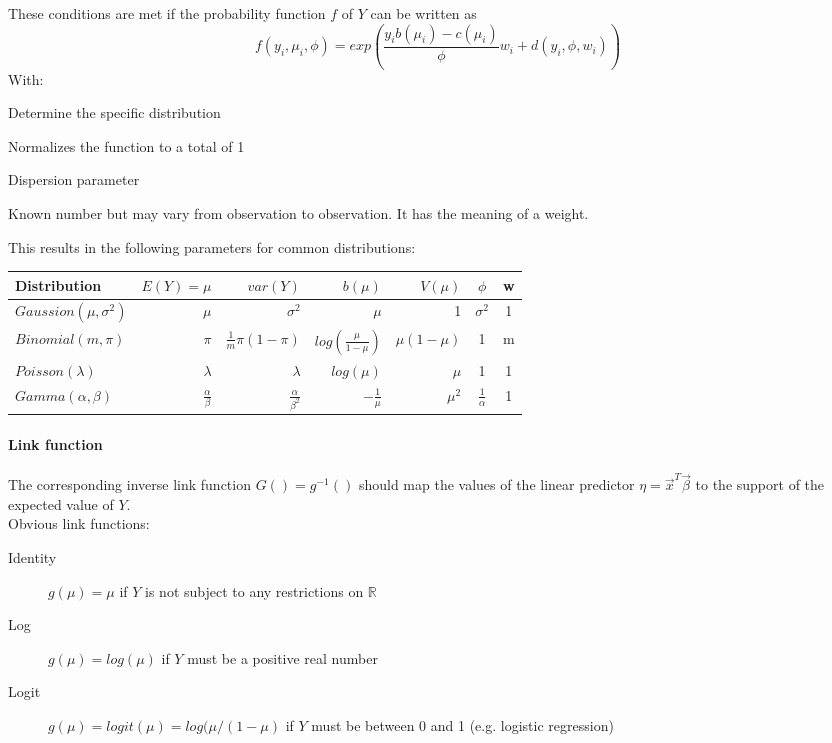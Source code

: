 These conditions are met if the probability function $f$ of $Y$ can be written as
\begin{equation*}
f(y_i, \mu_i, \phi) = exp(\frac{y_i b(\mu_i)-c(\mu_i)}{\phi}w_i+d(y_i, \phi, w_i))
\end{equation*}
With:
\begin{description}
	\tightlist
	\item[$b()$ and $c()$] Determine the specific distribution
	\item[$d()$] Normalizes the function to a total of 1
	\item[$\phi$] Dispersion parameter
	\item[$w_i$] Known number but may vary from observation to observation.	It has the meaning of a weight.
\end{description}

This results in the following parameters for common distributions:

\begin{tabular}{l||rr|rrcc}
	\hline 
	Distribution & $E(Y) = \mu$ & $var(Y)$ & $b(\mu)$ & $V(\mu)$ & $\phi$ & w \\
	\hline
	$Gaussion(\mu, \sigma^2)$ & $\mu$ & $\sigma^2$ & $\mu$ & 1 & $\sigma^2$ & 1\\
	$Binomial(m, \pi)$ & $\pi$ & $\frac{1}{m}\pi(1-\pi)$ & $log(\frac{\mu}{1-\mu})$ & $\mu(1-\mu)$ & 1 & m\\
	$Poisson(\lambda)$ & $\lambda$ & $\lambda$ & $log(\mu)$ & $\mu$ & 1 & 1\\
	$Gamma(\alpha, \beta)$ & $\frac{\alpha}{\beta}$ & $\frac{\alpha}{\beta^2}$ & $-\frac{1}{\mu}$ & $\mu^2$ & $\frac{1}{\alpha}$ & 1\\
	\hline
\end{tabular}

\paragraph{Link function}
The corresponding inverse link function $G() = g^{-1}()$ should map the values of the linear predictor $\eta = \vec{x}^T \vec{\beta}$ to the support of the expected value of $Y$.\\
Obvious link functions:
\begin{description}
	\item[Identity] $g(\mu) = \mu$ if $Y$ is not subject to any restrictions on $\mathbb{R}$
	\item[Log] $g(\mu) = log(\mu)$ if $Y$ must be a positive real number
	\item[Logit] $g(\mu) = logit(\mu)=log(\mu/(1-\mu)$ if $Y$ must be between 0 and 1 (e.g. logistic regression)
\end{description}

